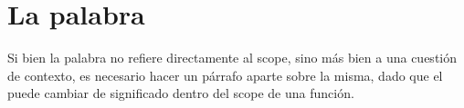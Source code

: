 \section{La palabra }
\label{sec:scopethis}

Si bien la palabra  no refiere directamente al scope, sino más bien a una cuestión de contexto, es necesario hacer un párrafo aparte sobre la misma, dado que el  puede cambiar de significado dentro del scope de una función.


